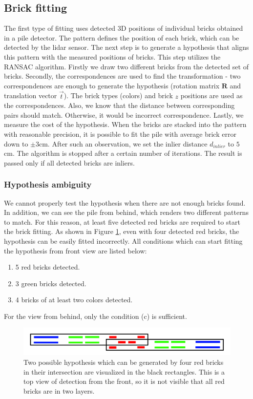 \subsection{Brick fitting}
The first type of fitting uses detected 3D positions of individual bricks obtained in a pile detector. The pattern defines the position of each brick, which can be detected by the lidar sensor. The next step is to generate a hypothesis that aligns this pattern with the measured positions of bricks. This step utilizes the RANSAC algorithm. Firstly we draw two different bricks from the detected set of bricks. Secondly, the correspondences are used to find the transformation - two correspondences are enough to generate the hypothesis (rotation matrix $\bm{R}$ and translation vector $\vec{t}$). The brick types (colors) and brick $z$ positions are used as the correspondences. Also, we know that the distance between corresponding pairs should match. Otherwise, it would be incorrect correspondence. Lastly, we measure the cost of the hypothesis. When the bricks are stacked into the pattern with reasonable precision, it is possible to fit the pile with average brick error down to $\pm 3$cm. After such an observation, we set the inlier distance $d_{inlier}$ to $5$cm. The algorithm is stopped after a certain number of iterations. The result is passed only if all detected bricks are inliers.

\subsubsection{Hypothesis ambiguity}
We cannot properly test the hypothesis when there are not enough bricks found. In addition, we can see the pile from behind, which renders two different patterns to match. For this reason, at least five detected red bricks are required to start the brick fitting. As shown in Figure \ref{fig:ambiguity}, even with four detected red bricks, the hypothesis can be easily fitted incorrectly. All conditions which can start fitting the hypothesis from front view are listed below:
\begin{enumerate}[label=(\alph*)]
\item 5 red bricks detected.
\item 3 green bricks detected.
\item 4 bricks of at least two colors detected.
\end{enumerate}
For the view from behind, only the condition (c) is sufficient.
\begin{figure}[H]
\centering
\includegraphics[scale=0.3]{fig/ambiguous.png}
\caption[Hypothesis ambiguity]{Two possible hypothesis which can be generated by four red bricks in their intersection are visualized in the black rectangles. This is a top view of detection from the front, so it is not visible that all red bricks are in two layers.}
\label{fig:ambiguity}
\end{figure}

